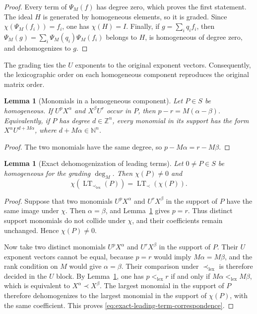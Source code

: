\documentclass[preprint,12pt,3p]{elsarticle}
\newtheorem{lemma}[theorem]{Lemma}
\theoremstyle{definition}
\theoremstyle{remark}
\newcommand{\LT}{\operatorname{LT}}
\begin{document}
	\begin{proof}
		Every term of $\Psi_M(f)$ has degree zero, which proves the first
		statement. The ideal $H$ is generated by homogeneous elements, so it
		is graded. Since $\chi(\Psi_M(f_i))=f_i$, one has
		$\chi(H)=I$. Finally, if $g=\sum_i q_i f_i$, then
		$\Psi_M(g)=\sum_i\Psi_M(q_i)\Psi_M(f_i)$ belongs to $H$, is
		homogeneous of degree zero, and dehomogenizes to $g$.
	\end{proof}
	
	The grading ties the $U$ exponents to the original exponent vectors.
	Consequently, the lexicographic order on each homogeneous component
	reproduces the original matrix order.
	
	\begin{lemma}[Monomials in a homogeneous component]
		\label{lem:homogeneous-component-structure}
		Let $P\in S$ be homogeneous. If $ U^pX^\alpha$ and
		$X^\beta U^r$ occur in $P$, then $p-r=M(\alpha-\beta)$. Equivalently,
		if $P$ has degree $d\in\mathbb Z^n$, every monomial in its support has
		the form $X^\alpha U^{d+M\alpha}$, where
		$d+M\alpha\in\mathbb N^n$.
	\end{lemma}
	
	\begin{proof}
		The two monomials have the same degree, so
		$p-M\alpha=r-M\beta$.
	\end{proof}
	
	\begin{lemma}[Exact dehomogenization of leading terms]
		\label{thm:exact-leading-term-correspondence}
		Let $0\neq P\in S$ be homogeneous for the grading $\deg_M$. Then
		$\chi(P)\neq0$ and
		\begin{equation}
			\label{eq:exact-leading-term-correspondence}
			\chi\!\left(\LT_{\prec_{\mathrm{lex}}}(P)\right)
			=
			\LT_\prec\!\left(\chi(P)\right).
		\end{equation}
	\end{lemma}
	
	\begin{proof}
		Suppose that two monomials $ U^pX^\alpha$ and $U^rX^\beta $ in the
		support of $P$ have the same image under $\chi$. Then
		$\alpha=\beta$, and Lemma~\ref{lem:homogeneous-component-structure}
		gives $p=r$. Thus distinct support monomials do not collide under
		$\chi$, and their coefficients remain unchanged. Hence
		$\chi(P)\neq0$.
		
		Now take two distinct monomials $ U^pX^\alpha$ and $U^rX^\beta $ in
		the support of $P$. Their $U$ exponent vectors cannot be equal,
		because $p=r$ would imply $M\alpha=M\beta$, and the rank condition on
		$M$ would give $\alpha=\beta$. Their comparison under
		$\prec_{\mathrm{lex}}$ is therefore decided in the $U$ block. By
		Lemma~\ref{lem:homogeneous-component-structure}, one has
		$p<_{\mathrm{lex}}r$ if and only if
		$M\alpha<_{\mathrm{lex}}M\beta$, which is equivalent to
		$X^\alpha\prec X^\beta$. The largest monomial in the support of $P$
		therefore dehomogenizes to the largest monomial in the support of
		$\chi(P)$, with the same coefficient. This proves
		\eqref{eq:exact-leading-term-correspondence}.
	\end{proof}
	
\end{document}

